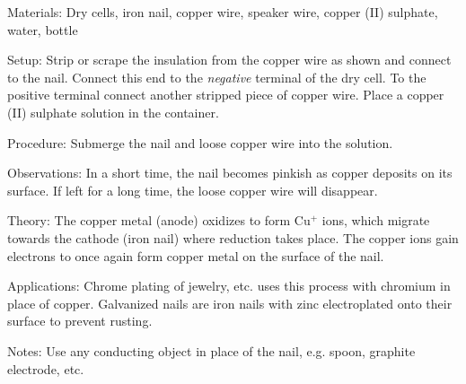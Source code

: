 \begin{multicols}{2}
\begin{description*}
\item[Materials:]{Dry cells, iron nail, copper wire, speaker wire, copper (II) sulphate, water, bottle}
\item[Setup:]{Strip or scrape the insulation from the copper wire as shown and connect to the nail. Connect this end to the \emph{negative} terminal of the dry cell. To the positive terminal connect another stripped piece of copper wire. Place a copper (II) sulphate solution in the container. }
\item[Procedure:]{Submerge the nail and loose copper wire into the solution.}
\item[Observations:]{In a short time, the nail becomes pinkish as copper deposits on its surface. If left for a long time, the loose copper wire will disappear.}
\item[Theory:]{The copper metal (anode) oxidizes to form Cu$^+$ ions, which migrate towards the cathode (iron nail) where reduction takes place. The copper ions gain electrons to once again form copper metal on the surface of the nail. }
\item[Applications:]{Chrome plating of jewelry, etc. uses this process with chromium in place of copper. Galvanized nails are iron nails with zinc electroplated onto their surface to prevent rusting.}
\item[Notes:]{Use any conducting object in place of the nail, e.g. spoon, graphite electrode, etc.}
\end{description*}


\end{multicols}

\pagebreak